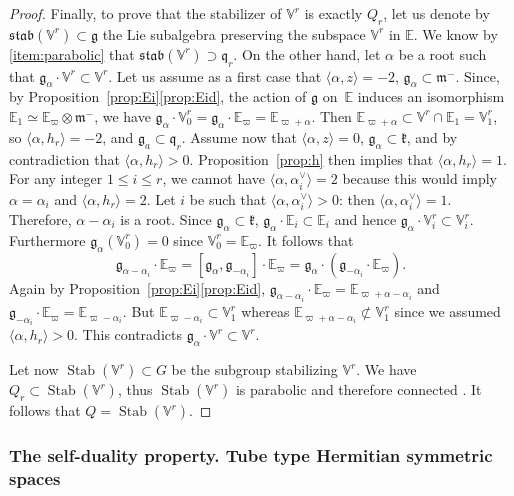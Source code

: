 \documentclass[JEP,XML,SOM,Unicode,NoFloatCountersInSection]{cedram}
\let\oldvee\vee
\renewcommand{\vee}{{\scriptscriptstyle\oldvee}}
\newcommand{\citestar}[3]{\cite[#3]{#1}}
\theoremstyle{plain}
\theoremstyle{definition}
\let\rgy r
\DeclareMathOperator{\Stab}{Stab}
\newcommand{\bE}{\mathbb{E}}
\newcommand{\Vr}{\mathbb{V}^\rgy}
\newcommand{\fgg}{\mathfrak{g}}
\newcommand{\fk}{\mathfrak{k}}
\newcommand{\fm}{\mathfrak{m}}
\newcommand{\fq}{\mathfrak{q}}
\newcommand{\fstab}{\mathfrak{stab}}
\newcommand{\scal}[1]{\langle #1 \rangle}
\begin{document}
\begin{proof}
Finally, to prove that the stabilizer of $\Vr$ is exactly $Q_\rgy$, let us denote by
\hbox{$\fstab(\Vr)\!\subset\!\fgg$} the Lie subalgebra
preserving the subspace $\Vr$ in $\bE$.
We know by \eqref{item:parabolic} that \hbox{$\fstab(\Vr)\!\supset\!\fq_\rgy$}.
On the other hand, let $\alpha$ be a root
such that $\fgg_\alpha \cdot \Vr \subset \Vr$.
Let us assume as a first case that $\scal{\alpha,z}=-2$, \ie $\fgg_\alpha\subset\fm^-$. Since, by
Proposition~\ref{prop:Ei}\eqref{prop:Eid}, the action of $\fgg$ on~$\bE$ induces
an isomorphism $\bE_1 \simeq \bE_\varpi \otimes \fm^-$, we have $\fgg_\alpha \cdot \Vr_0=\fgg_\alpha \cdot \bE_{\varpi} = \bE_{\varpi+\alpha}$.
Then $\bE_{\varpi+\alpha} \subset \Vr\cap\bE_1=\Vr_1$, so $\scal{\alpha,h_\rgy}=-2$, and $\fgg_a\subset\fq_\rgy$.
Assume now that $\scal{\alpha,z}=0$, \ie $\fgg_\alpha\subset\fk$, and by contradiction that $\scal{\alpha,h_\rgy}>0$.
Proposition~\ref{prop:h} then implies that $\scal{\alpha,h_\rgy}=1$.
For any integer $1\leq i\leq r$,
we cannot have $\scal{\alpha,\alpha_i^\vee}=2$ because this would imply $\alpha=\alpha_i$ and
$\scal{\alpha,h_\rgy}=2$. Let $i$ be such that $\scal{\alpha,\alpha_i^\vee}>0$: then
$\scal{\alpha,\alpha_i^\vee}=1$. Therefore, $\alpha-\alpha_i$ is a root.
Since $\fgg_\alpha\subset\fk$, $\fgg_\alpha\cdot \bE_i\subset\bE_i$ and hence
$\fgg_\alpha\cdot\Vr_i\subset\Vr_i$. Furthermore $\fgg_\alpha(\Vr_0)=0$ since $\Vr_0=\bE_\varpi$.
It follows that
$$
\fgg_{\alpha-\alpha_i} \cdot \bE_{\varpi} = [ \fgg_\alpha, \fgg_{-\alpha_i} ] \cdot \bE_{\varpi}
= \fgg_\alpha \cdot (\fgg_{-\alpha_i} \cdot \bE_{\varpi}).
$$
Again by Proposition~\ref{prop:Ei}\eqref{prop:Eid}, $\fgg_{\alpha-\alpha_i} \cdot \bE_{\varpi} = \bE_{\varpi + \alpha -
\alpha_i}$ and $\fgg_{-\alpha_i}\cdot\bE_\varpi= \bE_{\varpi-\alpha_i}$. But $\bE_{\varpi-\alpha_i}\subset \Vr_1$
whereas $\bE_{\varpi + \alpha - \alpha_i}\not\subset\Vr_1$ since we assumed $\scal{\alpha,h_\rgy}>0$.
This contradicts $\fgg_\alpha \cdot \Vr \subset \Vr$.

Let now $\Stab(\Vr) \subset G$ be the subgroup stabilizing $\Vr$. We have $Q_\rgy \subset \Stab
(\Vr)$, thus $\Stab(\Vr)$ is parabolic and therefore connected \citestar{humphreys}*{Cor.\,23.1.B}. It
follows that $Q=\Stab(\Vr)$.
\end{proof}

\subsubsection{The self-duality property. Tube type Hermitian symmetric spaces}
\label{subsubsec:tube}
\end{document}
